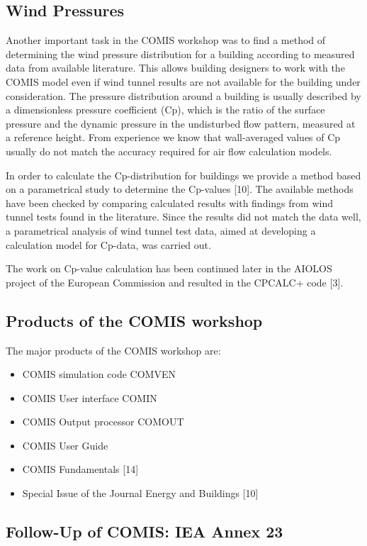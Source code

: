 \documentclass[10pt]{book}
\begin{document}
\subsection{Wind Pressures}

Another important task in the COMIS workshop was to find a method of determining the wind pressure distribution for a building according to measured data from available literature. This allows building designers to work with the COMIS model even if wind tunnel results are not available for the building under consideration. The pressure distribution around a building is usually described by a dimensionless pressure coefficient (Cp), which is the ratio of the surface pressure and the dynamic pressure in the undisturbed flow pattern, measured at a reference height. From experience we know that wall-averaged values of Cp usually do not match the accuracy required for air flow calculation models.

In order to calculate the Cp-distribution for buildings we provide a method based on a parametrical study to determine the Cp-values [10]. The available methods have been checked by comparing calculated results with findings from wind tunnel tests found in the literature. Since the results did not match the data well, a parametrical analysis of wind tunnel test data, aimed at developing a calculation model for Cp-data, was carried out.

The work on Cp-value calculation has been continued later in the AIOLOS project of the European Commission and resulted in the CPCALC+ code [3].

\subsection{Products of the COMIS workshop}

The major products of the COMIS workshop are: 

\begin{itemize}
\item COMIS simulation code COMVEN
\item COMIS User interface COMIN
\item COMIS Output processor COMOUT
\item COMIS User Guide
\item COMIS Fundamentals [14]
\item Special Issue of the Journal Energy and Buildings [10]
\end{itemize}

\subsection{Follow-Up of COMIS: IEA Annex 23}
\end{document}
